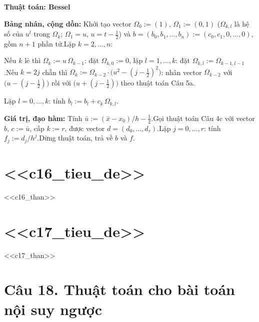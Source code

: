 \documentclass[11pt,a4paper]{article}
\newenvironment{thuattoan}[1]
  {\par\medskip\noindent\textbf{Thuật toán: #1}\begin{description}[style=standard,align=left,leftmargin=4.3em,labelwidth=3.9em,labelsep=0.4em,itemsep=1pt,topsep=3pt,font=\normalfont\bfseries]}
  {\end{description}}
\newenvironment{con}
  {\begin{description}[style=standard,align=left,leftmargin=2.1em,labelwidth=1.8em,labelsep=0.3em,itemsep=0pt,topsep=1pt,font=\normalfont]}
  {\end{description}}
\begin{document}
\begin{thuattoan}{Bessel}
\item[Bước 4:] \textbf{Bảng nhân, cộng dồn:} Khởi tạo vector $\Omega_0:=(1)$, $\Omega_1:=(0,1)$ ($\Omega_{k,l}$ là hệ số của $u^l$ trong $\Omega_k$; $\Omega_1=u$, $u=t-\frac12$) và $b=(b_0,b_1,\dots,b_n):=(c_0,c_1,0,\dots,0)$, gồm $n+1$ phần tử.\newline Lặp $k=2,\dots,n$:
  \begin{con}
  \item[4.1:] Nếu $k$ lẻ thì $\Omega_k:=u\,\Omega_{k-1}$: đặt $\Omega_{k,0}:=0$, lặp $l=1,\dots,k$: đặt $\Omega_{k,l}:=\Omega_{k-1,l-1}$.\newline Nếu $k=2j$ chẵn thì $\Omega_k:=\Omega_{k-2}\cdot\big(u^2-(j-\frac12)^2\big)$: nhân vector $\Omega_{k-2}$ với $\big(u-(j-\frac12)\big)$ rồi với $\big(u+(j-\frac12)\big)$ theo thuật toán Câu 5a.
  \item[4.2:] Lặp $l=0,\dots,k$: tính $b_l:=b_l+c_k\,\Omega_{k,l}$.
  \end{con}
\item[Bước 5:] \textbf{Giá trị, đạo hàm:} Tính $\bar u:=(\bar x-x_0)/h-\frac12$.\newline Gọi thuật toán Câu 4c với vector $b$, $c:=\bar u$, cấp $k:=r$, được vector $d=(d_0,\dots,d_r)$.\newline Lặp $j=0,\dots,r$: tính $f_j:=d_j/h^j$.\newline Dừng thuật toán, trả về $b$ và $f$.
\end{thuattoan}

\section{<<c16_tieu_de>>}

<<c16_than>>

\section{<<c17_tieu_de>>}

<<c17_than>>

\section{Câu 18. Thuật toán cho bài toán nội suy ngược}
\end{document}
